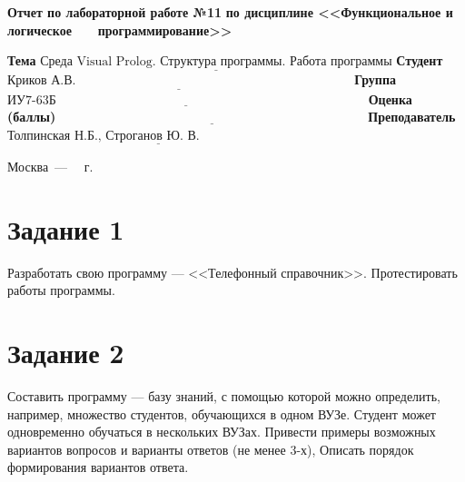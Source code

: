 \documentclass[12pt]{report}
\begin{document}
\begin{titlepage}
		\begin{center}
			\noindent\begin{minipage}{1.1\textwidth}\centering
				\Large\textbf{  Отчет по лабораторной работе №11}\newline
				\textbf{по дисциплине <<Функциональное и логическое}\newline
				\textbf{~~~программирование>>}\newline\newline
			\end{minipage}
		\end{center}
		
		\noindent\textbf{Тема} $\underline{\text{Среда Visual Prolog. Структура программы. Работа программы}}$\newline\newline
		\noindent\textbf{Студент} $\underline{\text{Криков А.В.~~~~~~~~~~~~~~~~~~~~~~~~~~~~~~~~~~~~~~~~~~~~~~~~~~~~~~~~~~~~~~~~~}}$\newline\newline
		\noindent\textbf{Группа} $\underline{\text{ИУ7-63Б~~~~~~~~~~~~~~~~~~~~~~~~~~~~~~~~~~~~~~~~~~~~~~~~~~~~~~~~~~~~~~~~~~~~~~~~~}}$\newline\newline
		\noindent\textbf{Оценка (баллы)} $\underline{\text{~~~~~~~~~~~~~~~~~~~~~~~~~~~~~~~~~~~~~~~~~~~~~~~~~~~~~~~~~~~~~~~~~~~~~~~~}}$\newline\newline
		\noindent\textbf{Преподаватель} $\underline{\text{Толпинская Н.Б., Строганов Ю. В.~~~~~~~~~~~~~~~~~~~~~~~~~~}}$\newline\newline\newline
		
		\begin{center}
			\vfill
			Москва~---~\the\year
			~г.
		\end{center}
	\end{titlepage}
	




	\section*{Задание 1}
	Разработать свою программу — <<Телефонный справочник>>. Протестировать работы программы.
	

\section*{Задание 2}
Составить программу — базу знаний, с помощью которой можно определить, например, множество студентов, обучающихся в одном ВУЗе. Студент может одновременно обучаться в нескольких ВУЗах. Привести примеры возможных вариантов вопросов и варианты ответов (не менее 3-х), Описать порядок формирования вариантов ответа.
\end{document}
